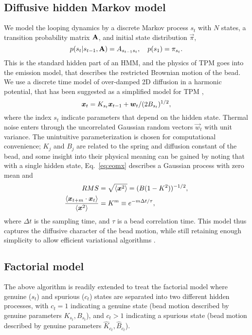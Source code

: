 \subsection{Diffusive hidden Markov model}
We model the looping dynamics by a discrete Markov process $s_t$ with
$N$ states, a transition probability matrix $\mathbf{A}$, and initial
state distribution $\vec{\pi}$,
\begin{equation}\label{eq:eoms}
  p(s_t|s_{t-1},\mathbf{A})=A_{s_{t-1}s_t},\quad p(s_1)=\pi_{s_t}.
\end{equation}
This is the standard hidden part of an HMM, and the physics of TPM
goes into the emission model, that describes the restricted Brownian
motion of the bead. We use a discrete time model of over-damped 2D
diffusion in a harmonic potential, that has been suggested as a
simplified model for TPM \cite{beausang2007b,lindner2013},
\begin{equation}\label{eq:eomx}
  \boldsymbol{x}_t=K_{s_t}\boldsymbol{x}_{t-1}+\boldsymbol{w}_t/(2B_{s_t})^{1/2},
\end{equation}
where the index $s_t$ indicate parameters that depend on the hidden
state.  Thermal noise enters through the uncorrelated Gaussian random
vectors $\vec{w}_t$ with unit variance. The unintuitive
parameterization is chosen for computational convenience; $K_j$ and
$B_j$ are related to the spring and diffusion constant of the bead,
and some insight into their physical meaning can be gained by noting
that with a single hidden state, Eq.~\ref{eq:eomx} describes a
Gaussian process with zero mean and
\begin{align}
RMS&=\sqrt{\left\langle \boldsymbol{x}^2\right\rangle}=(B(1-K^2))^{-1/2},\nonumber\\
\frac{\left\langle \boldsymbol{x}_{t+m}\cdot\boldsymbol{x}_t\right\rangle}{\left\langle \boldsymbol{x}^2\right\rangle}&
=K^m\equiv e^{-m\Delta t/\tau},\label{eq:1state}
\end{align}
where $\Delta t$ is the sampling time, and $\tau$ is a bead
correlation time.  This model thus captures the diffusive character of
the bead motion, while still retaining enough simplicity to allow
efficient variational algorithms
\cite{mackay1997,bishop2006}.

\subsection{Factorial model}
The above algorithm is readily extended to treat the factorial model
where genuine ($s_t$) and spurious ($c_t$) states are separated into
two different hidden processes, with $c_t=1$ indicating a genuine
state (bead motion described by genuine parameters $K_{s_t},B_{s_t}$),
and $c_t>1$ indicating a spurious state (bead motion described by
genuine parameters $\hat K_{c_t},\hat B_{c_t}$). 

